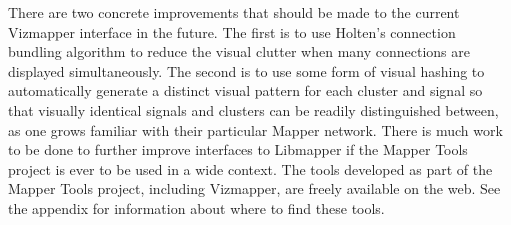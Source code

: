There are two concrete improvements that should be made to the current Vizmapper interface in the future. The first is to use Holten's connection bundling algorithm \cite{edgebundles2006} to reduce the visual clutter when many connections are displayed simultaneously. The second is to use some form of visual hashing to automatically generate a distinct visual pattern for each cluster and signal so that visually identical signals and clusters can be readily distinguished between, as one grows familiar with their particular Mapper network. There is much work to be done to further improve interfaces to Libmapper if the Mapper Tools project is ever to be used in a wide context. The tools developed as part of the Mapper Tools project, including Vizmapper, are freely available on the web. See the appendix for information about where to find these tools.

